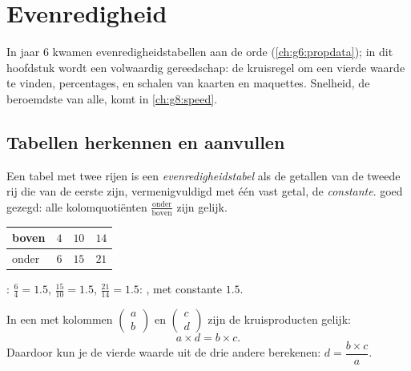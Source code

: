 \chapter{Evenredigheid}\label{ch:g7:prop}

In jaar 6 kwamen evenredigheidstabellen aan de orde (\cref{ch:g6:propdata}); in
dit hoofdstuk wordt  een volwaardig gereedschap: de kruisregel om een
vierde waarde te vinden, percentages, en schalen van kaarten en maquettes.
Snelheid, de beroemdste  van alle, komt in \cref{ch:g8:speed}.

\section{Tabellen herkennen en aanvullen}

\begin{definition}[Evenredigheidstabel]\label{def:g7:prop:table}
Een tabel met twee rijen is een
\emph{evenredigheidstabel} als de getallen van de tweede rij
die van de eerste zijn, vermenigvuldigd met één vast getal, de
\emph{constante}.  goed gezegd: alle kolomquotiënten
$\frac{\text{onder}}{\text{boven}}$ zijn gelijk.
\end{definition}

\begin{example}\label{ex:g7:prop:recognize}
\begin{center}
\renewcommand{\arraystretch}{1.3}
\begin{tabular}{l|ccc}
boven & $4$ & $10$ & $14$ \\
\hline
onder & $6$ & $15$ & $21$ \\
\end{tabular}
\end{center}
: $\frac64 = 1.5$, $\frac{15}{10} = 1.5$, $\frac{21}{14} = 1.5$:
, met constante $1.5$.
\end{example}

\begin{theorem}[Kruisregel]\label{thm:g7:prop:cross}
In een  met kolommen $\begin{pmatrix} a \\ b \end{pmatrix}$ en
$\begin{pmatrix} c \\ d \end{pmatrix}$ zijn de kruisproducten gelijk:
\[
a \times d = b \times c .
\]
Daardoor kun je de vierde waarde uit de drie andere berekenen:
$d = \dfrac{b \times c}{a}$.
\end{theorem}

